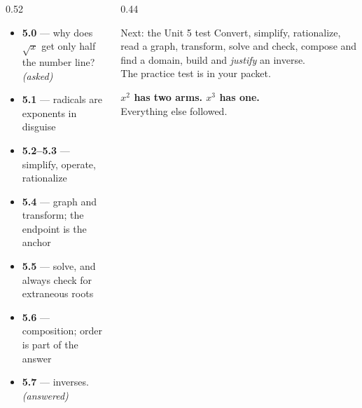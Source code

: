 \documentclass[aspectratio=169, 11pt]{beamer}
\begin{document}
\begin{frame}[t, plain]
  \begin{columns}[T]
    \begin{column}{0.52\textwidth}
      \footnotesize
      \begin{itemize}\setlength{\itemsep}{3pt}
        \item \textbf{5.0} --- why does $\sqrt{x}$ get only half the number line? \emph{(asked)}
        \item \textbf{5.1} --- radicals are exponents in disguise
        \item \textbf{5.2--5.3} --- simplify, operate, rationalize
        \item \textbf{5.4} --- graph and transform; the endpoint is the anchor
        \item \textbf{5.5} --- solve, and always check for extraneous roots
        \item \textbf{5.6} --- composition; order is part of the answer
        \item \textbf{5.7} --- inverses. \emph{(answered)}
      \end{itemize}
    \end{column}
    \begin{column}{0.44\textwidth}
      \footnotesize
      \begin{block}{Next: the Unit 5 test}
        Convert, simplify, rationalize, read a graph, transform, solve and check, compose and find a
        domain, build and \emph{justify} an inverse. \\[4pt]
        The practice test is in your packet.
      \end{block}
      \vspace{4pt}
      \begin{center}
        \textbf{$x^{2}$ has two arms. $x^{3}$ has one.} \\[3pt]
        Everything else followed.
      \end{center}
    \end{column}
  \end{columns}
\end{frame}
\end{document}
